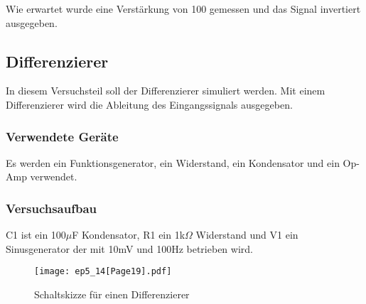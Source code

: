 \documentclass[12pt,a4paper]{article}
\begin{document}
Wie erwartet wurde eine Verstärkung von 100 gemessen und das Signal invertiert ausgegeben.


\subsection{Differenzierer}

In diesem Versuchsteil soll der Differenzierer simuliert werden. Mit einem Differenzierer wird die Ableitung des Eingangssignals ausgegeben.

\subsubsection{Verwendete Geräte}

Es werden ein Funktionsgenerator, ein Widerstand, ein Kondensator und ein Op-Amp verwendet.


\subsubsection{Versuchsaufbau}

C1 ist ein 100$\mu$F Kondensator, R1 ein 1k$\Omega$ Widerstand und V1 ein Sinusgenerator der mit 10mV und 100Hz betrieben wird.

\begin{figure}[H] 
  \centering
    \texttt{[image: ep5\_14[Page19].pdf]}
  	\caption[Schaltskizze für einen Differenzierer]{Schaltskizze für einen Differenzierer\footnotemark}
  \label{fig:4_a_3}
\end{figure}
\end{document}
